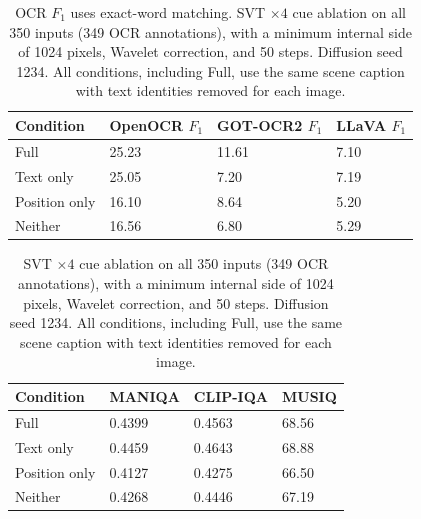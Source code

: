 \begin{table}[H]
\centering
\caption{OCR $F_1$ uses exact-word matching. SVT $\times4$ cue ablation on all 350 inputs (349 OCR annotations), with a minimum internal side of 1024 pixels, Wavelet correction, and 50 steps. Diffusion seed 1234. All conditions, including Full, use the same scene caption with text identities removed for each image.}
\label{tab:ar-svt-cues-ocr}
\small
\setlength{\tabcolsep}{4pt}
\begin{tabular}{llll}
\toprule
Condition & OpenOCR $F_1$ & GOT-OCR2 $F_1$ & LLaVA $F_1$ \\
\midrule
Full & 25.23 & 11.61 & 7.10 \\
Text only & 25.05 & 7.20 & 7.19 \\
Position only & 16.10 & 8.64 & 5.20 \\
Neither & 16.56 & 6.80 & 5.29 \\
\bottomrule
\end{tabular}
\end{table}

\begin{table}[H]
\centering
\caption{SVT $\times4$ cue ablation on all 350 inputs (349 OCR annotations), with a minimum internal side of 1024 pixels, Wavelet correction, and 50 steps. Diffusion seed 1234. All conditions, including Full, use the same scene caption with text identities removed for each image.}
\label{tab:ar-svt-cues-iqa}
\small
\setlength{\tabcolsep}{4pt}
\begin{tabular}{llll}
\toprule
Condition & MANIQA & CLIP-IQA & MUSIQ \\
\midrule
Full & 0.4399 & 0.4563 & 68.56 \\
Text only & 0.4459 & 0.4643 & 68.88 \\
Position only & 0.4127 & 0.4275 & 66.50 \\
Neither & 0.4268 & 0.4446 & 67.19 \\
\bottomrule
\end{tabular}
\end{table}
